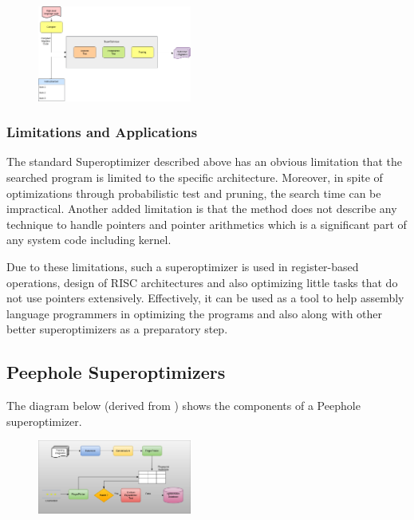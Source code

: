 \documentclass[sigconf]{acmart}
\begin{document}
\begin{figure}[h]
  \includegraphics[width=0.45\textwidth]{images/superoptimizer}
\end{figure}

\subsubsection{Limitations and Applications}
The standard Superoptimizer described above has an obvious limitation that the searched program is limited to the specific architecture. Moreover, in spite of optimizations through probabilistic test and pruning, the search time can be impractical. Another added limitation is that the method does not describe any technique to handle pointers and pointer arithmetics which is a significant part of any system code including kernel. 

Due to these limitations, such a superoptimizer is used in register-based operations, design of RISC architectures and also optimizing little tasks that do not use pointers extensively. Effectively, it can be used as a tool to help assembly language programmers in optimizing the programs and also along with other better superoptimizers \cite{peephole2006} as a preparatory step.

\subsection{Peephole Superoptimizers}

The diagram below (derived from \cite{peephole2006}) shows the components of a Peephole superoptimizer.

\begin{figure}[h]
  \includegraphics[width=0.45\textwidth]{images/autosuperopt}
\end{figure}
\end{document}
